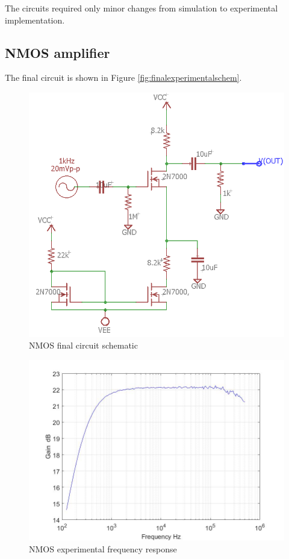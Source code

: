 
The circuits required only minor changes from simulation to experimental implementation.	
	

\subsection{NMOS amplifier}
The final circuit is shown in Figure \ref{fig:finalexperimentalschem}.
\begin{figure}[H]
	\centering
	\includegraphics[width=0.7\linewidth]{ExperimentalImplementation/NMOS_exp}
	\caption{NMOS final circuit schematic}
	\label{fig:nmosexp}
\end{figure}



\begin{figure}[H]
	\centering
	\includegraphics[width=0.7\linewidth]{ExperimentalImplementation/nmosamp.jpg}
	\caption{NMOS experimental frequency response}
	\label{fig:nmosexp}
\end{figure}

